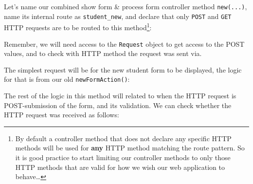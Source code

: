 \documentclass[a4paperpaper,openright]{book}
\newenvironment{Shaded}{}{}
\newcommand{\CommentTok}[1]{\textcolor[rgb]{0.38,0.63,0.69}{\textit{#1}}}
\newcommand{\KeywordTok}[1]{\textcolor[rgb]{0.00,0.44,0.13}{\textbf{#1}}}
\newcommand{\NormalTok}[1]{#1}
\newcommand{\OtherTok}[1]{\textcolor[rgb]{0.00,0.44,0.13}{#1}}
\newcommand{\StringTok}[1]{\textcolor[rgb]{0.25,0.44,0.63}{#1}}
\begin{document}
Let's name our combined show form \& process form controller method
\texttt{new(...)}, name its internal route as \texttt{student\_new}, and
declare that only \texttt{POST} and \texttt{GET} HTTP requests are to be
routed to this method\footnote{By default a controller method that does
  not declare any specific HTTP methods will be used for \textbf{any}
  HTTP method matching the route pattern. So it is good practice to
  start limiting our controller methods to only those HTTP methods that
  are valid for how we wish our web application to behave\ldots{}}:

\begin{Shaded}
\end{Shaded}

Remember, we will need access to the \texttt{Request} object to get
access to the POST values, and to check with HTTP method the request was
sent via.

The simplest request will be for the new student form to be displayed,
the logic for that is from our old \texttt{newFormAction()}:

\begin{Shaded}
\end{Shaded}

The rest of the logic in this method will related to when the HTTP
request is POST-submission of the form, and its validation. We can check
whether the HTTP request was received as follows:

\begin{Shaded}
\end{Shaded}
\end{document}
